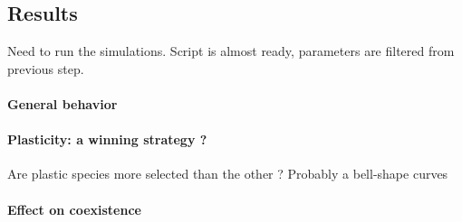 \subsection{Results}

Need to run the simulations. Script is almost ready, parameters are filtered from previous step.

\paragraph{General behavior}
\paragraph{Plasticity: a winning strategy ?}
Are plastic species more selected than the other ? Probably a bell-shape curves

\paragraph{Effect on coexistence}
